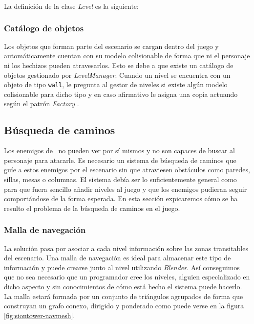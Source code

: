 La definición de la clase \textit{Level} es la siguiente:




\subsubsection{Catálogo de objetos}

Los objetos que forman parte del escenario se cargan dentro del juego y
automáticamente cuentan con su modelo colisionable de forma que ni el personaje
ni los hechizos pueden atravesarlos. Esto se debe a que existe un catálogo
de objetos gestionado por \textit{LevelManager}. Cuando un nivel se encuentra
con un objeto de tipo \texttt{wall}, le pregunta al gestor de niveles si
existe algún modelo colisionable para dicho tipo y en caso afirmativo
le asigna una copia actuando según el patrón \textit{Factory} \cite{gamm77}.\\


\subsection{Búsqueda de caminos}

Los enemigos de \juego\ no pueden ver por sí mismos y no son capaces de buscar
al personaje para atacarle. Es necesario un sistema de búsqueda de caminos
que guíe a estos enemigos por el escenario sin que atraviesen obstáculos
como paredes, sillas, mesas o columnas. El sistema debía ser lo suficientemente
general como para que fuera sencillo añadir niveles al juego y que los enemigos
pudieran seguir comportándose de la forma esperada. En esta sección expicaremos
cómo se ha resulto el problema de la búsqueda de caminos en el juego.\\

\subsubsection{Malla de navegación}

La solución pasa por asociar a cada nivel información sobre las zonas
transitables del escenario. Una malla de navegación es ideal para almacenar
este tipo de información y puede crearse junto al nivel utilizando \textit{Blender}.
Así conseguimos que no sea necesario que un programador cree los niveles, alguien
especializado en dicho aspecto y sin conocimientos de cómo está hecho el sistema
puede hacerlo. La malla estará formada por un conjunto de triángulos agrupados de forma
que construyan un grafo conexo, dirigido y ponderado como puede verse en
la figura \ref{fig:siontower-navmesh}.\\

